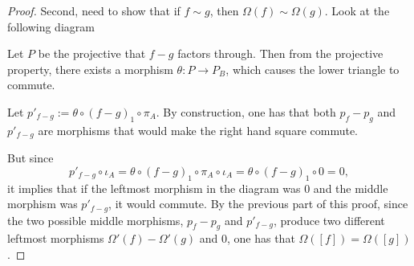 \begin{proof}
    Second, need to show that if \( f \sim g \), then \( \Omega(f) \sim \Omega(g) \). Look at the following diagram

    \begin{center}
    \end{center}

    Let \( P \) be the projective that \( f - g \) factors through. Then from the projective property, there exists a morphism \( \theta: P \to P_B \), which causes the lower triangle to commute.

    Let \( p'_{f - g} := \theta \circ (f - g)_1 \circ \pi_A \). By construction, one has that both \( p_f - p_g \) and \( p'_{f - g} \) are morphisms that would make the right hand square commute.
    
    But since
    \[
        p'_{f - g} \circ \iota_A = \theta \circ (f-g)_1 \circ \pi_A \circ \iota_A = \theta \circ (f-g)_1 \circ 0 = 0,
    \]
    it implies that if the leftmost morphism in the diagram was \( 0 \) and the middle morphism was \( p'_{f - g} \), it would commute. By the previous part of this proof, since the two possible middle morphisms, \( p_f - p_g \) and \( p'_{f - g} \), produce two different leftmost morphisms \( \Omega'(f) - \Omega'(g) \) and \( 0 \), one has that \( \Omega([f]) = \Omega([g]) \).
\end{proof}

